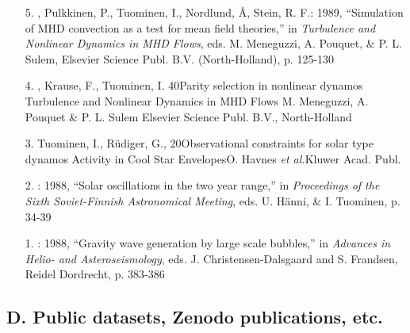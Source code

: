 \begin{itemize}
\item[5.]
\Brandenburg, Pulkkinen, P., Tuominen, I.,
Nordlund, \AA, Stein, R. F.: 1989, 
``Simulation of MHD convection as a test for mean field theories,''
in {\em Turbulence and Nonlinear Dynamics in MHD Flows},
eds. M. Meneguzzi, A. Pouquet, \& P. L. Sulem, Elsevier Science Publ. B.V.
(North-Holland), p. 125-130

\item[4.]
\Brandenburg, Krause, F., Tuominen, I.
{40}{Parity selection in nonlinear dynamos}
{Turbulence and Nonlinear Dynamics in MHD Flows}
{M. Meneguzzi, A. Pouquet \& P. L. Sulem}
{Elsevier Science Publ. B.V., North-Holland}

\item[3.]
Tuominen, I., R\"udiger, G., \Brandenburg{}
{20}{Observational constraints for solar type dynamos}
{Activity in Cool Star Envelopes}{O. Havnes {\em et al.}}{Kluwer Acad. Publ.}

\item[2.]
\Brandenburg: 1988, ``Solar oscillations in the two year range,''
in {\em Proceedings of the Sixth Soviet-Finnish Astronomical Meeting}, 
eds. U. H\"anni, \& I. Tuominen, p. 34-39

\item[1.]
\Brandenburg: 1988,
``Gravity wave generation by large scale bubbles,''
in {\em Advances in Helio- and Asteroseismology}, 
eds. J. Christensen-Dalsgaard and S. Frandsen, Reidel Dordrecht, p. 383-386

\end{itemize}

\subsection*{D. Public datasets, Zenodo publications, etc.}%

